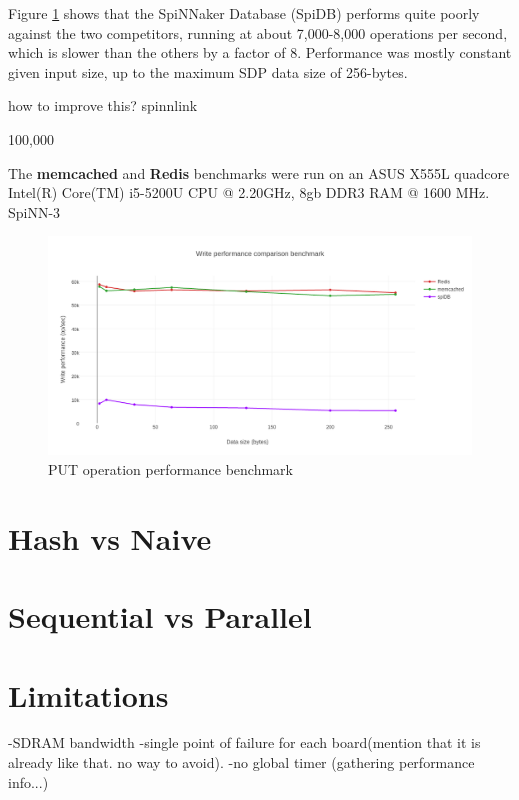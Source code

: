 Figure \ref{fig:write-perf-benchmark} shows that the SpiNNaker Database (SpiDB) performs quite poorly against the two competitors, running at about 7,000-8,000 operations per second, which is slower than the others by a factor of 8. Performance was mostly constant given input size, up to the maximum SDP data size of 256-bytes.

how to improve this? spinnlink


100,000

The \textbf{memcached} and \textbf{Redis} benchmarks were run on an ASUS X555L quadcore Intel(R) Core(TM) i5-5200U CPU @ 2.20GHz, 8gb DDR3 RAM @ 1600 MHz. SpiNN-3

\begin{figure}
\begin{center}
	\includegraphics[width=1.4\textwidth, natwidth=1063, natheight=509]{images/write_performance.png}
\end{center}
\caption{PUT operation performance benchmark}
\label{fig:write-perf-benchmark}
\end{figure}

\section{Hash vs Naive}

\section{Sequential vs Parallel}

\section{Limitations}
-SDRAM bandwidth
-single point of failure for each board(mention that it is already like that. no way to avoid).
-no global timer (gathering performance info...)

